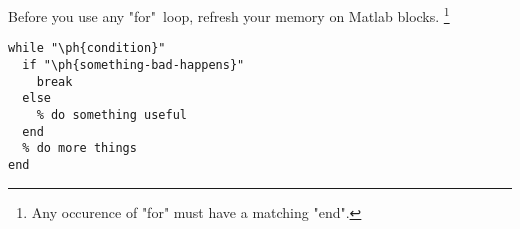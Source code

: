 \documentclass{article}
\let\ph\mlplaceholder %
\begin{document}
\lstlistoflistings



Before you use any "for"~loop, refresh your memory on Matlab blocks.%
\footnote{Any occurence of "for" must have a matching "end".}


\pagebreak

\begin{lstlisting}[caption = {For educational purposes}]
% example of while loop using placeholders
while "\ph{condition}"
  if "\ph{something-bad-happens}"
    break
  else
    % do something useful
  end
  % do more things
end
\end{lstlisting}
\end{document}
